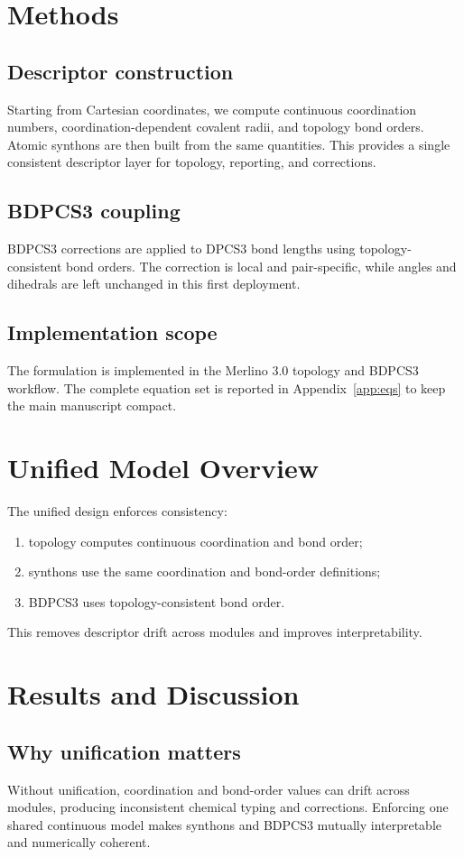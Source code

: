\documentclass[a4paper,11pt]{article}
\begin{document}
\section{Methods}
\subsection{Descriptor construction}
Starting from Cartesian coordinates, we compute continuous coordination numbers, coordination-dependent covalent radii, and topology bond orders. Atomic synthons are then built from the same quantities. This provides a single consistent descriptor layer for topology, reporting, and corrections.

\subsection{BDPCS3 coupling}
BDPCS3 corrections are applied to DPCS3 bond lengths using topology-consistent bond orders. The correction is local and pair-specific, while angles and dihedrals are left unchanged in this first deployment.

\subsection{Implementation scope}
The formulation is implemented in the Merlino 3.0 topology and BDPCS3 workflow. The complete equation set is reported in Appendix~\ref{app:eqs} to keep the main manuscript compact.


\section{Unified Model Overview}
The unified design enforces consistency:
\begin{enumerate}
\item topology computes continuous coordination and bond order;
\item synthons use the same coordination and bond-order definitions;
\item BDPCS3 uses topology-consistent bond order.
\end{enumerate}
This removes descriptor drift across modules and improves interpretability.

\section{Results and Discussion}
\subsection{Why unification matters}
Without unification, coordination and bond-order values can drift across modules, producing inconsistent chemical typing and corrections. Enforcing one shared continuous model makes synthons and BDPCS3 mutually interpretable and numerically coherent.
\end{document}
